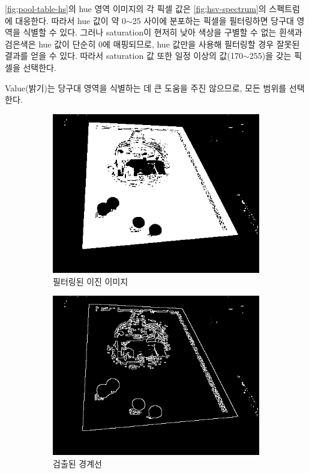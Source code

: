 \documentclass[10pt]{oblivoir}
\begin{document}
\cref{fig;pool-table-hs}의 hue 영역 이미지의 각 픽셀 값은 \cref{fig;hsv-spectrum}의 스펙트럼에 대응한다. 따라서 hue 값이 약 0$\sim$25 사이에 분포하는 픽셀을 필터링하면 당구대 영역을 식별할 수 있다. 그러나 saturation이 현저히 낮아 색상을 구별할 수 없는 흰색과 검은색은 hue 값이 단순히 0에 매핑되므로, hue 값만을 사용해 필터링할 경우 잘못된 결과를 얻을 수 있다. 따라서 saturation 값 또한 일정 이상의 값(170$\sim$255)을 갖는 픽셀을 선택한다.

Value(밝기)는 당구대 영역을 식별하는 데 큰 도움을 주진 않으므로, 모든 범위를 선택한다.

\begin{figure}[ht]
    \centering
    \begin{subfigure}{0.4\textwidth}
        \includegraphics[width=\textwidth]{img/billiards-table-filter.png}
        \caption{필터링된 이진 이미지}
        \label{fig;pool-table-edge-a}
    \end{subfigure}
    \begin{subfigure}{0.4\textwidth}
        \includegraphics[width=\textwidth]{img/billiards-table-edge.png}
        \caption{검출된 경계선}
        \label{fig;pool-table-edge-b}
    \end{subfigure}
    \caption{}
    \label{fig;pool-table-edge}
\end{figure}
\end{document}
